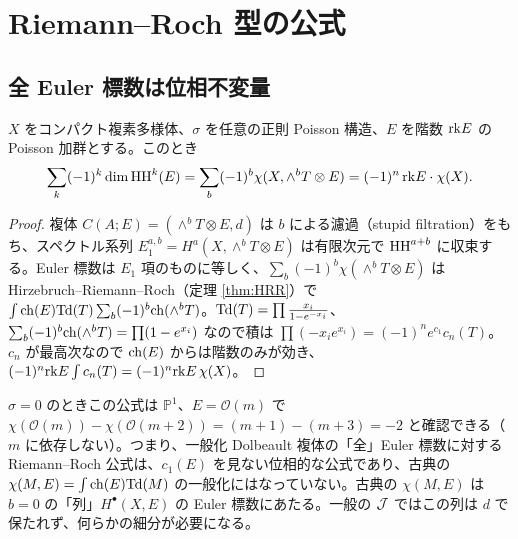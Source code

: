 \section{Riemann--Roch 型の公式}\label{sec:RR}
\subsection{全 Euler 標数は位相不変量}
\begin{prop}\tP\label{prop:euler}
$X$ をコンパクト複素多様体、$\sigma$ を任意の正則 Poisson 構造、$E$ を階数 $\mathrm{rk} E$ の Poisson 加群とする。このとき
\[\sum_k(-1)^k\dim\mathrm{HH}^k(E)=\sum_b(-1)^b\chi(X,\wedge^bT\otimes E)=(-1)^n\,\mathrm{rk} E\cdot\chi(X).\]
\end{prop}
\begin{proof}
複体 $C(A;E)=(\wedge^bT\otimes E,d)$ は $b$ による濾過（stupid filtration）をもち、スペクトル系列 $E_1^{a,b}=H^a(X,\wedge^bT\otimes E)$ は有限次元で $\mathrm{HH}^{a+b}$ に収束する。Euler 標数は $E_1$ 項のものに等しく、$\sum_b(-1)^b\chi(\wedge^bT\otimes E)$ は Hirzebruch--Riemann--Roch（定理 \ref{thm:HRR}）で
$\int\mathrm{ch}(E)\mathrm{Td}(T)\sum_b(-1)^b\mathrm{ch}(\wedge^bT)$。$\mathrm{Td}(T)=\prod\frac{x_i}{1-e^{-x_i}}$、$\sum_b(-1)^b\mathrm{ch}(\wedge^bT)=\prod(1-e^{x_i})$ なので積は $\prod(-x_ie^{x_i})=(-1)^ne^{c_1}c_n(T)$。$c_n$ が最高次なので $\mathrm{ch}(E)$ からは階数のみが効き、$(-1)^n\mathrm{rk} E\int c_n(T)=(-1)^n\mathrm{rk} E\,\chi(X)$。\qedhere
\end{proof}
\begin{rem}[\tP\ 意味するところ]
$\sigma=0$ のときこの公式は $\mathbb{P}^1$、$E=\mathcal O(m)$ で $\chi(\mathcal O(m))-\chi(\mathcal O(m+2))=(m+1)-(m+3)=-2$ と確認できる（$m$ に依存しない）。つまり、一般化 Dolbeault 複体の「全」Euler 標数に対する Riemann--Roch 公式は、$c_1(E)$ を見ない位相的な公式であり、古典の $\chi(M,E)=\int\mathrm{ch}(E)\mathrm{Td}(M)$ の一般化にはなっていない。古典の $\chi(M,E)$ は $b=0$ の「列」$H^\bullet(X,E)$ の Euler 標数にあたる。一般の $\mathcal J$ ではこの列は $d$ で保たれず、何らかの細分が必要になる。
\end{rem}

